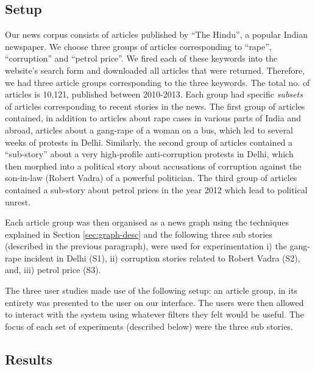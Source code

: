 \subsection{Setup}
Our news corpus consists of articles published by ``The Hindu'', a popular Indian newspaper. We choose three groups of articles corresponding to ``rape'', ``corruption'' and ``petrol price''. We fired each of these keywords into the website's search form and downloaded all articles that were returned. Therefore, we had three article groups corresponding to the three keywords. The total no. of articles is 10,121, published between 2010-2013. Each group had specific \emph{subsets} of articles corresponding to recent stories in the news. The first group of articles contained, in addition to articles about rape cases in various parts of India and abroad, articles about a gang-rape of a woman on a bus, which led to several weeks of protests in Delhi. Similarly, the second group of articles contained a ``sub-story'' about a very high-profile anti-corruption protests in Delhi, which then morphed into a political story about accusations of corruption against the son-in-law (Robert Vadra) of a powerful politician. The third group of articles contained a sub-story about petrol prices in the year 2012 which lead to political unrest. %

Each article group was then organised as a news graph using the techniques explained in Section \ref{sec:graph-desc}  %
and the following three sub stories (described in the previous paragraph), were used for experimentation i) the gang-rape incident in Delhi (S1), ii) corruption stories related to Robert Vadra (S2), and, iii) petrol price (S3).

The three user studies made use of the following setup: an article group, in its entirety was presented to the user on our interface. The users were then allowed to interact with the system using whatever filters they felt would be useful. The focus of each set of experiments (described below) were the three sub stories.


\subsection{Results}

